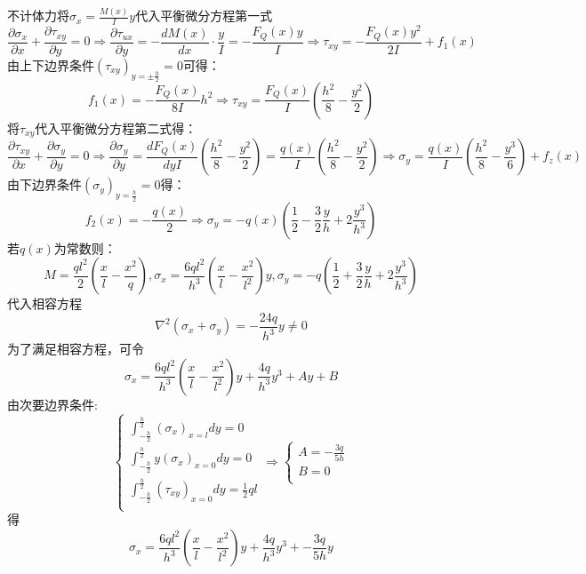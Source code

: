 \begin{remark}
	不计体力将$\sigma _x=\frac{M\left( x \right)}{I}y$代入平衡微分方程第一式
	\[\frac{\partial \sigma _x}{\partial x}+\frac{\partial \tau _{xy}}{\partial y}=0\Longrightarrow \frac{\partial \tau _{ux}}{\partial y}=-\frac{dM\left( x \right)}{dx}\cdot \frac{y}{I}=-\frac{F_Q\left( x \right) y}{I}\Longrightarrow \tau _{xy}=-\frac{F_Q\left( x \right) y^2}{2I}+f_1\left( x \right) \]
	由上下边界条件$\left( \tau _{xy} \right) _{y=\pm \frac{h}{2}}=0$可得：\[f_1\left( x \right) =-\frac{F_Q\left( x \right)}{8I}h^2\Longrightarrow \tau _{xy}=\frac{F_Q\left( x \right)}{I}\left( \frac{h^2}{8}-\frac{y^2}{2} \right) \]
	将$\tau _{xy}$代入平衡微分方程第二式得：\[\frac{\partial \tau _{xy}}{\partial x}+\frac{\partial \sigma _y}{\partial y}=0\Longrightarrow \frac{\partial \sigma _y}{\partial y}=\frac{dF_Q\left( x \right)}{dyI}\left( \frac{h^2}{8}-\frac{y^2}{2} \right) =\frac{q\left( x \right)}{I}\left( \frac{h^2}{8}-\frac{y^2}{2} \right) \Longrightarrow \sigma _y=\frac{q\left( x \right)}{I}\left( \frac{h^2}{8}-\frac{y^3}{6} \right) +f_z\left( x \right) \]
	由下边界条件$\left( \sigma _y \right) _{y=\frac{h}{2}}=0$得：\[f_2\left( x \right) =-\frac{q\left( x \right)}{2}\Longrightarrow \sigma _y=-q\left( x \right) \left( \frac{1}{2}-\frac{3}{2}\frac{y}{h}+2\frac{y^3}{h^3} \right) \]
	若$q\left( x \right) $为常数则：\[M=\frac{ql^2}{2}\left( \frac{x}{l}-\frac{x^2}{q} \right) ,\sigma _x=\frac{6ql^2}{h^3}\left( \frac{x}{l}-\frac{x^2}{l^2} \right) y,\sigma _y=-q\left( \frac{1}{2}+\frac{3}{2}\frac{y}{h}+2\frac{y^3}{h^3} \right) \]
	代入相容方程\[\nabla ^2\left( \sigma _x+\sigma _y \right) =-\frac{24q}{h^3}y\ne 0\]
	为了满足相容方程，可令\[\sigma _x=\frac{6ql^2}{h^3}\left( \frac{x}{l}-\frac{x^2}{l^2} \right) y+\frac{4q}{h^3}y^3+Ay+B\]
	由次要边界条件:\[\begin{cases}
	\int_{-\frac{h}{2}}^{\frac{h}{2}}{\left( \sigma _x \right) _{x=l}dy}=0\\
	\int_{-\frac{h}{2}}^{\frac{h}{2}}{y\left( \sigma _x \right) _{x=0}dy}=0\\
	\int_{-\frac{h}{2}}^{\frac{h}{2}}{\left( \tau _{xy} \right) _{x=0}dy=\frac{1}{2}ql}\\
	\end{cases}\Longrightarrow \begin{cases}
	A=-\frac{3q}{5h}\\
	B=0\\
	\end{cases}\]
	得\[\sigma _x=\frac{6ql^2}{h^3}\left( \frac{x}{l}-\frac{x^2}{l^2} \right) y+\frac{4q}{h^3}y^3+-\frac{3q}{5h}y\]
	
\end{remark}
